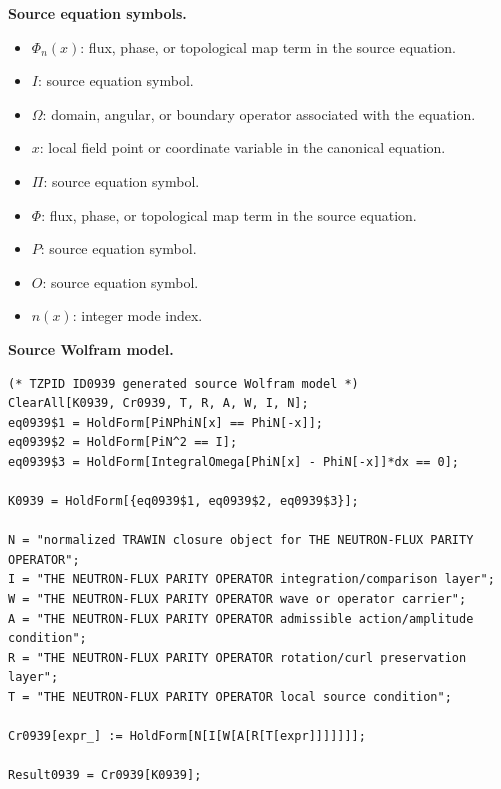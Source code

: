 \begin{minipage}[t]{0.49\linewidth}
\begingroup
\small
\raggedright
\textbf{Source equation symbols.}\par
\begin{itemize}[leftmargin=1.35em,itemsep=1pt,topsep=1pt,parsep=0pt]
    \item $\Phi_n(x)$: flux, phase, or topological map term in the source equation.
    \item $I$: source equation symbol.
    \item $\Omega$: domain, angular, or boundary operator associated with the equation.
    \item $x$: local field point or coordinate variable in the canonical equation.
    \item $\Pi$: source equation symbol.
    \item $\Phi$: flux, phase, or topological map term in the source equation.
    \item $P$: source equation symbol.
    \item $O$: source equation symbol.
    \item $n(x)$: integer mode index.
\end{itemize}
\endgroup
\end{minipage}\hfill
\begin{minipage}[t]{0.47\linewidth}
\begingroup
\scriptsize
\raggedright
\textbf{Source Wolfram model.}\par
\begin{Verbatim}[fontsize=\tiny,breaklines=true,breakanywhere=true]
(* TZPID ID0939 generated source Wolfram model *)
ClearAll[K0939, Cr0939, T, R, A, W, I, N];
eq0939$1 = HoldForm[PiNPhiN[x] == PhiN[-x]];
eq0939$2 = HoldForm[PiN^2 == I];
eq0939$3 = HoldForm[IntegralOmega[PhiN[x] - PhiN[-x]]*dx == 0];

K0939 = HoldForm[{eq0939$1, eq0939$2, eq0939$3}];

N = "normalized TRAWIN closure object for THE NEUTRON-FLUX PARITY OPERATOR";
I = "THE NEUTRON-FLUX PARITY OPERATOR integration/comparison layer";
W = "THE NEUTRON-FLUX PARITY OPERATOR wave or operator carrier";
A = "THE NEUTRON-FLUX PARITY OPERATOR admissible action/amplitude condition";
R = "THE NEUTRON-FLUX PARITY OPERATOR rotation/curl preservation layer";
T = "THE NEUTRON-FLUX PARITY OPERATOR local source condition";

Cr0939[expr_] := HoldForm[N[I[W[A[R[T[expr]]]]]]];

Result0939 = Cr0939[K0939];
\end{Verbatim}
\endgroup
\end{minipage}

